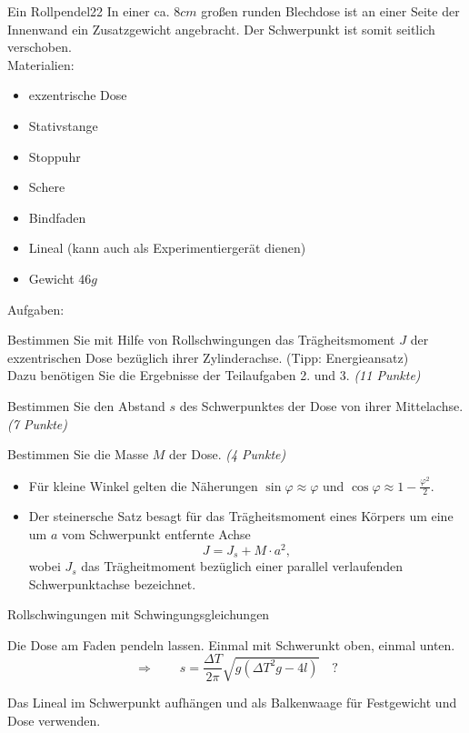 

\begin{problem}{Ein Rollpendel}{22}
In einer ca. $8\unit{cm}$ großen runden Blechdose ist an einer Seite der Innenwand ein Zusatzgewicht angebracht. Der Schwerpunkt ist somit seitlich verschoben.\\
Materialien:
\begin{itemize}
\item exzentrische Dose
\item Stativstange
\item Stoppuhr
\item Schere
\item Bindfaden
\item Lineal (kann auch als Experimentiergerät dienen)
\item Gewicht $46\unit{g}$
\end{itemize}
Aufgaben:
\begin{abcenum}
\item Bestimmen Sie mit Hilfe von Rollschwingungen das Trägheitsmoment $J$ der exzentrischen Dose bezüglich ihrer Zylinderachse. (Tipp: Energieansatz)\\
Dazu benötigen Sie die Ergebnisse der Teilaufgaben 2. und 3. \emph{(11 Punkte)}
\item Bestimmen Sie den Abstand $s$ des Schwerpunktes der Dose von ihrer Mittelachse. \emph{(7 Punkte)}
\item Bestimmen Sie die Masse $M$ der Dose. \emph{(4 Punkte)}
\end{abcenum}
\hinweis
\begin{itemize}
\item Für kleine Winkel gelten die Näherungen $\sin{\varphi}\approx\varphi$ und $\cos{\varphi}\approx1-\frac{\varphi^2}{2}$.
\item Der steinersche Satz besagt für das Trägheitsmoment eines Körpers um eine um $a$ vom Schwerpunkt entfernte Achse
\[
J=J_s+M\cdot a^2,
\]
wobei $J_s$ das Trägheitmoment bezüglich einer parallel verlaufenden Schwerpunktachse bezeichnet.
\end{itemize}
\begin{expsolution}
\begin{abcenum}
\item Rollschwingungen mit Schwingungsgleichungen
\item Die Dose am Faden pendeln lassen. Einmal mit Schwerunkt oben, einmal unten.
\[
\Rightarrow\qquad s=\frac{\Delta T}{2\pi}\sqrt{g\left(\Delta T^2g-4l\right)}\quad?
\]
\item Das Lineal im Schwerpunkt aufhängen und als Balkenwaage für Festgewicht und Dose verwenden.
\end{abcenum}
\end{expsolution}
\end{problem}

